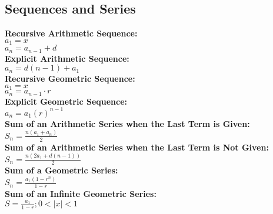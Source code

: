 \documentclass[12pt]{article}
\begin{document}
\subsection*{Sequences and Series}
\textbf{Recursive Arithmetic Sequence:}
    \\ \( a_1 = x \)
    \\ \( a_n = a_{n - 1} + d \)
\\ \textbf{Explicit Arithmetic Sequence:}
    \\ \( a_n = d( n - 1 ) + a_1 \)
\\ \textbf{Recursive Geometric Sequence:}
    \\ \( a_1 = x \)
    \\ \( a_n = a_{n - 1} \cdot r \)
\\ \textbf{Explicit Geometric Sequence:}
    \\ \( a_n = a_1 ( r )^{n - 1} \)
\\ \textbf{Sum of an Arithmetic Series when the Last Term is Given:}
    \\ \( S_n = \displaystyle\frac{ n( a_1 + a_n ) }{ 2 } \)
\\ \textbf{Sum of an Arithmetic Series when the Last Term is Not Given:}
    \\ \( S_n = \displaystyle\frac{ n( 2a_1 + d( n - 1 ) ) }{ 2 } \)
\\ \textbf{Sum of a Geometric Series:}
    \\ \( S_n = \displaystyle\frac{ a_1 ( 1 - r^n ) }{ 1 - r } \)
\\ \textbf{Sum of an Infinite Geometric Series:}
    \\ \( S = \displaystyle\frac{ a_1 }{ 1 - r } ; 0 < | x | < 1 \)
\end{document}
